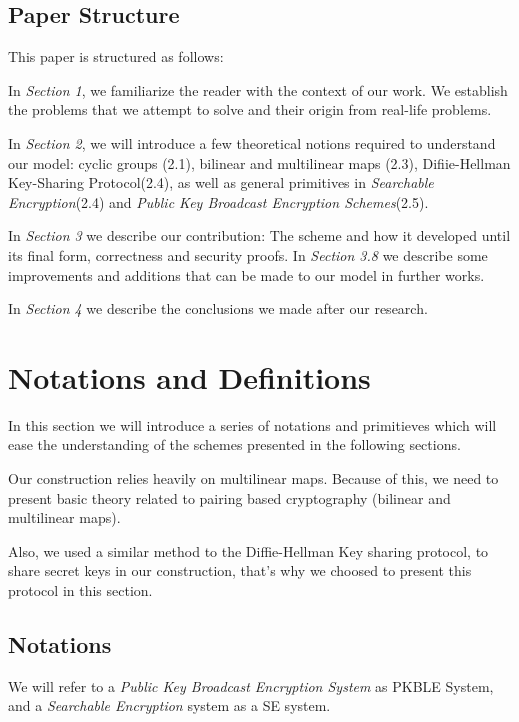\documentclass[a4paper, 12pt, oneside]{article}
\begin{document}
\subsection{Paper Structure}
This paper is structured as follows: 

\bigskip
In \textit{Section 1}, we familiarize the reader with the context of our work. We establish the problems that we attempt to solve and their origin from real-life problems. 

\bigskip
In \textit{Section 2}, we will introduce a few theoretical notions required to understand our model: cyclic groups (2.1), bilinear and multilinear maps (2.3), Difiie-Hellman Key-Sharing Protocol(2.4), as well as general primitives in \textit{Searchable Encryption}(2.4) and \textit{Public Key Broadcast Encryption Schemes}(2.5). 

\bigskip
In \textit{Section 3} we describe our contribution: The scheme and how it developed until its final form, correctness and security proofs. In \textit{Section 3.8} we describe some improvements and additions that can be made to our model in further works.

\bigskip
In \textit{Section 4} we describe the conclusions we made after our research.

\newpage
\section{Notations and Definitions}

In this section we will introduce a series of notations and primitieves which will ease the understanding of the schemes presented in the following sections.

Our construction relies heavily on multilinear maps. Because of this, we need to present basic theory related to pairing based cryptography (bilinear and multilinear maps).

Also, we used a similar method to the Diffie-Hellman Key sharing protocol, to share secret keys in our construction, that's why we choosed to present this protocol in this section.

\subsection{Notations}

We will refer to a \textit{Public Key Broadcast Encryption System} as PKBLE System, and a \textit{Searchable Encryption} system as a SE system.\\
\end{document}

